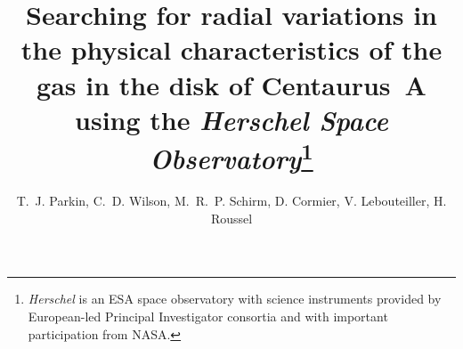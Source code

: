 \documentclass[preprint2]{aastex}
\begin{document}

\title{Searching for radial variations in the physical characteristics of the gas in the disk of Centaurus~A using the \emph{Herschel Space Observatory}\footnote{\emph{Herschel} is an ESA space observatory with science instruments provided by European-led Principal Investigator consortia and with important participation from NASA.}}


\author{T.~J. Parkin, C.~D. Wilson, M.~R.~P. Schirm, D. Cormier, V. Lebouteiller, H. Roussel}
\end{document}
